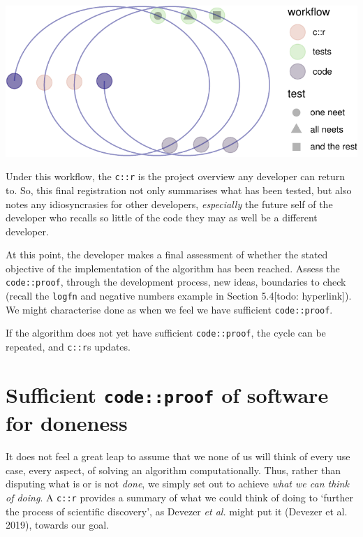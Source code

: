 \documentclass[
]{article}
\begin{document}
\begin{center}\includegraphics{when-is-done-done_files/figure-latex/unnamed-chunk-10-1} \end{center}

Under this workflow, the \texttt{c::r} is the project overview any
developer can return to. So, this final registration not only summarises
what has been tested, but also notes any idiosyncrasies for other
developers, \emph{especially} the future self of the developer who
recalls so little of the code they may as well be a different developer.

At this point, the developer makes a final assessment of whether the
stated objective of the implementation of the algorithm has been
reached. Assess the \texttt{code::proof}, through the development
process, new ideas, boundaries to check (recall the \texttt{logfn} and
negative numbers example in Section 5.4{[}todo: hyperlink{]}). We might
characterise done as when we feel we have sufficient
\texttt{code::proof}.

If the algorithm does not yet have sufficient \texttt{code::proof}, the
cycle can be repeated, and \texttt{c::r}s updates.

\hypertarget{sufficient-codeproof-of-software-for-doneness}{%
\section{\texorpdfstring{Sufficient \texttt{code::proof} of software for
doneness}{Sufficient code::proof of software for doneness}}\label{sufficient-codeproof-of-software-for-doneness}}

It does not feel a great leap to assume that we none of us will think of
every use case, every aspect, of solving an algorithm computationally.
Thus, rather than disputing what is or is not \emph{done}, we simply set
out to achieve \emph{what we can think of doing}. A \texttt{c::r}
provides a summary of what we could think of doing to `further the
process of scientific discovery', as Devezer \emph{et al.} might put it
(Devezer et al. 2019), towards our goal.
\end{document}

